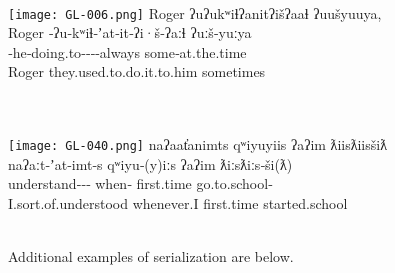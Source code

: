 \begin{exe}
  \ex\label{ex:3.13}
  \begin{xlist}

    \renewcommand{\eachwordfive}{\rule[-10pt]{0pt}{0pt}\rmfamily}

    \ex\label{ex:3.13a}
    \\
    \texttt{[image: GL-006.png]}
    \glllll Roger     ʔuʔukʷiɬʔanitʔišʔaaɬ                                     ʔuušyuuya,\\
            Roger     ‑ʔu‑kʷiɬ‑ʼat‑it‑ʔi·š‑ʔaːɬ                           ʔuːš‑yuːya\\
             ‑he‑doing.to‑‑‑‑always some‑at.the.time\\
            Roger     they.used.to.do.it.to.him                                sometimes\\
                                                              \\

    \ex\label{ex:3.13b}
    \\
    \texttt{[image: GL-040.png]}
    \glllll naʔaat̓animts                            qʷiyuyiis          ʔaʔim      ƛiisƛiisšiƛ\\
            naʔaːt‑ʼat‑imt‑s                         qʷiyu‑(y)iːs        ʔaʔim      ƛiːsƛiːs‑ši(ƛ)\\
            understand‑‑‑ when‑ first.time go.to.school‑\\
            I.sort.of.understood                    whenever.I         first.time started.school\\
                                           { }                 \\

    \renewcommand{\eachwordfive}{\rmfamily}

  \end{xlist}
\end{exe}

\noindent Additional examples of serialization are below.

